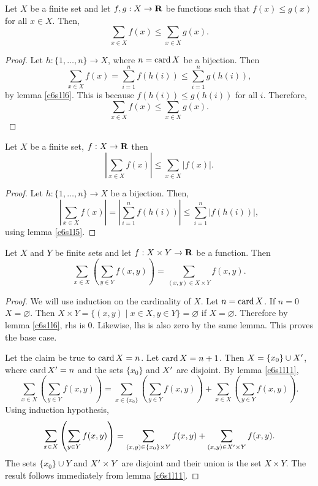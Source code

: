 \begin{lem}\label{c6s1l14}
Let $X$ be a finite set and let $f, g: X \rightarrow \mathbf{R}$ be functions
such that $f(x) \le g(x)$ for all $x \in X$. Then,
\[
\sum_{x \in X}f(x) \le \sum_{x \in X}g(x).
\]
\end{lem}
\begin{proof}
Let $h:\{1, \ldots, n\} \rightarrow X$, where $n = \operatorname{card}{X}$ be a bijection.
Then 
\[
\sum_{x \in X}f(x) = \sum_{i=1}^n f(h(i)) \le \sum_{i=1}^n g(h(i)),
\]
by lemma \ref{c6s1l6}. This is because $f(h(i)) \le g(h(i))$ for all $i$.
Therefore,
\[
\sum_{x \in X}f(x) \le \sum_{x \in X}g(x).
\]
\end{proof}

\begin{lem}\label{c6s1l15}
Let $X$ be a finite set, $f:X \rightarrow \mathbf{R}$ then
\[
\left|\sum_{x \in X}f(x)\right| \le \sum_{x \in X}|f(x)|.
\]
\end{lem}
\begin{proof}
Let $h:\{1, \ldots, n\} \rightarrow X$ be a bijection. Then,
\[
\left|\sum_{x \in X}f(x)\right| = \left|\sum_{i=1}^n f(h(i))\right| \le
\sum_{i=1}^n |f(h(i))|,
\]
using lemma \ref{c6s1l5}.
\end{proof}

\begin{lem}\label{c6s1l16}
Let $X$ and $Y$ be finite sets and let $f: X \times Y \rightarrow \mathbf{R}$ be
a function. Then
\[
\sum_{x \in X}\left(\sum_{y \in Y} f(x, y)\right) = 
\sum_{(x, y) \in X \times Y} f(x, y).
\]
\end{lem}
\begin{proof}
We will use induction on the cardinality of $X$. Let $n = \operatorname{card} X$. If $n=0$
$X = \varnothing$. Then $X \times Y = \{(x, y) \;|\; x \in X, y \in Y\} =
\varnothing$ if $X = \varnothing$. Therefore by lemma \ref{c6s1l6}, rhs is
$0$. Likewise, lhs is also zero by the same lemma. This proves the base
case.

Let the claim be true to $\operatorname{card}{X} = n$. Let $\operatorname{card}{X} = n+1$. Then $X =
\{x_0\} \cup X^\prime$, where $\operatorname{card} X^\prime = n$ and the sets $\{x_0\}$ and 
$X^\prime$ are disjoint. By lemma \ref{c6s1l11},
\[
\sum_{x \in X}\left(\sum_{y \in Y} f(x, y)\right) = 
\sum_{x \in \{x_0\}}\left(\sum_{y \in Y}f(x, y)\right) +
\sum_{x \in X}\left(\sum_{y \in Y}f(x, y)\right).
\]
Using induction hypothesis,
\[
\sum_{x \in X}\left(\sum_{y \in Y} f(x, y)\right) = 
\sum_{(x, y) \in \{x_0\} \times Y} f(x, y) + 
\sum_{(x, y) \in X^\prime \times Y} f(x, y).
\]
The sets $\{x_0\} \cup Y$ and $X^\prime \times Y$ are disjoint and their
union is the set $X \times Y$. The result follows immediately from lemma
\ref{c6s1l11}.
\end{proof}

